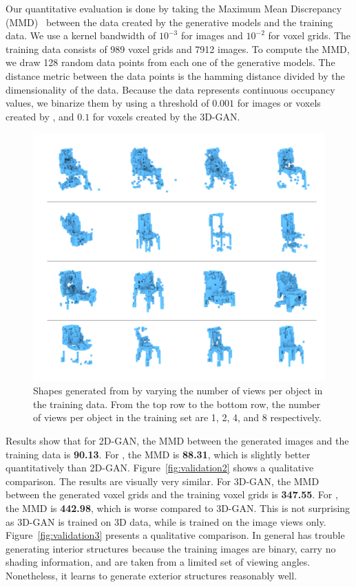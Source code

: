 Our quantitative evaluation is done by taking the Maximum Mean Discrepancy (MMD)~\cite{gretton2006kernel} 
between the data created by the generative models and the training data.
We use a kernel bandwidth of $10^{-3}$ for images and $10^{-2}$ for voxel grids.
The training data consists of 989 voxel grids and 7912 images.
To compute the MMD, we draw 128 random data points from each one of the generative models.
The distance metric between the data points is the hamming distance divided by the dimensionality of the data.
Because the data represents continuous occupancy values, we binarize them by using a threshold of $0.001$ for images or voxels created
by \prgan, and $0.1$ for voxels created by the 3D-GAN.

\begin{figure}[t]
\centering
\includegraphics[width=0.75\linewidth]{prgan/fig/varying_views.png}
\caption{\label{fig:varying_views} Shapes generated from \prgan by varying the number of views per object in the training data. From the top row to the bottom row, the number of views per object in the training set are 1, 2, 4, and 8 respectively.}
\vspace{-8pt}
\end{figure}

Results show that for 2D-GAN, the MMD between the generated images and the training data is \textbf{90.13}. For \prgan, the MMD is \textbf{88.31}, which is slightly better quantitatively than 2D-GAN. Figure~\ref{fig:validation2} shows a qualitative comparison. The results are visually very similar. For 3D-GAN, the MMD between the generated voxel grids and the training voxel grids is \textbf{347.55}. For \prgan, the MMD is \textbf{442.98}, which is worse compared to 3D-GAN. This is not surprising as 3D-GAN is trained on 3D data, while \prgan is trained on the image views only. Figure~\ref{fig:validation3} presents a qualitative comparison. In general \prgan has trouble generating interior structures because the training images are binary, carry no shading information, and are taken from a limited set of viewing angles. Nonetheless, it learns to generate exterior structures reasonably well.



